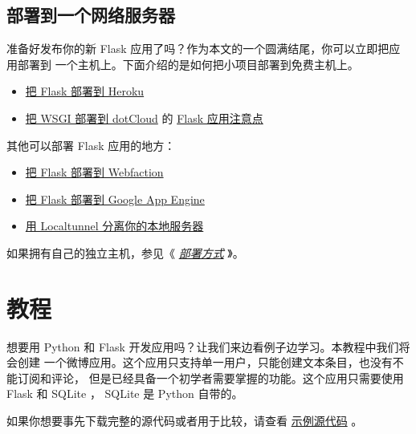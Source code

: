 \documentclass[a4paper,12pt]{sphinxmanual}
\begin{document}
\section{部署到一个网络服务器}
\label{quickstart:quickstart-deployment}\label{quickstart:id20}
准备好发布你的新 Flask 应用了吗？作为本文的一个圆满结尾，你可以立即把应用部署到
一个主机上。下面介绍的是如何把小项目部署到免费主机上。
\begin{itemize}
\item {} 
\href{http://devcenter.heroku.com/articles/python}{把 Flask 部署到 Heroku}

\item {} 
\href{http://docs.dotcloud.com/services/python/}{把 WSGI 部署到 dotCloud} 的
\href{http://flask.pocoo.org/snippets/48/}{Flask 应用注意点}

\end{itemize}

其他可以部署 Flask 应用的地方：
\begin{itemize}
\item {} 
\href{http://flask.pocoo.org/snippets/65/}{把 Flask 部署到 Webfaction}

\item {} 
\href{https://github.com/kamalgill/flask-appengine-template}{把 Flask 部署到 Google App Engine}

\item {} 
\href{http://flask.pocoo.org/snippets/89/}{用 Localtunnel 分离你的本地服务器}

\end{itemize}

如果拥有自己的独立主机，参见《 {\hyperref[deploying/index:deployment]{\emph{部署方式}}} 》。


\chapter{教程}
\label{tutorial/index::doc}\label{tutorial/index:tutorial}\label{tutorial/index:id1}
想要用 Python 和 Flask 开发应用吗？让我们来边看例子边学习。本教程中我们将会创建
一个微博应用。这个应用只支持单一用户，只能创建文本条目，也没有不能订阅和评论，
但是已经具备一个初学者需要掌握的功能。这个应用只需要使用 Flask 和 SQLite ，
SQLite 是 Python 自带的。

如果你想要事先下载完整的源代码或者用于比较，请查看 \href{http://github.com/mitsuhiko/flask/tree/master/examples/flaskr/}{示例源代码} 。
\end{document}
